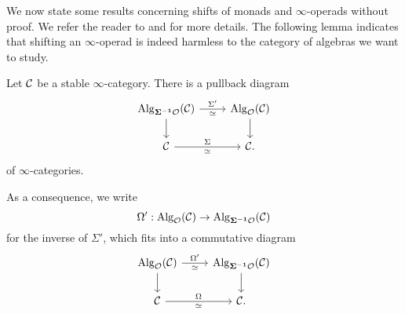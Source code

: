 We now state some results concerning shifts of monads and $\infty$-operads without proof. We refer the reader to \cite[Section 2.2.4.]{Hadrianphdthesis} and \cite{Camarena_mod2_free_spectral_Lie_algebra} for more details.
The following lemma indicates that shifting an $\infty$-operad is indeed harmless to the category of algebras we want to study.
\begin{lemma}
\cite[Section 2.2.4.]{Hadrianphdthesis}
\label{Shift has no harm}
Let ${\mathcal{C}}$ be a stable $\infty$-category.
There is a pullback diagram
\[
    \begin{tikzcd}
	\Alg_{\bf{\Sigma}^{-1} \CO }(\CC)    & \Alg_{\CO}(\CC) \\
	 \CC & \CC
	\arrow[from=1-1, to = 1-2, "\Sigma'", "\simeq" below]
	\arrow[from=1-1 , to =2-1,  left]
	\arrow[from=1-2 , to =2-2,  right]
	\arrow[from=2-1, to=2-2, "\Sigma", "\simeq" below].
\end{tikzcd}
\]
of $\infty$-categories.
\end{lemma}
As a consequence, we write  
$$
\Omega':
\operatorname{Alg}_{{\mathcal{O}}}({\mathcal{C}}) \to \operatorname{Alg}_{\bf{\Sigma}^{-1} {\mathcal{O}} }({\mathcal{C}})
$$
for the inverse of $\Sigma'$,
which fits into a commutative diagram
\[
    \begin{tikzcd}
	\Alg_{\CO}(\CC)    & \Alg_{\bf{\Sigma}^{-1} \CO }(\CC) \\
	 \CC & \CC
	\arrow[from=1-1, to = 1-2, "\Omega'", "\simeq" below]
	\arrow[from=1-1 , to =2-1,  left]
	\arrow[from=1-2 , to =2-2,  right]
	\arrow[from=2-1, to=2-2, "\Omega", "\simeq" below].
\end{tikzcd}
\]

